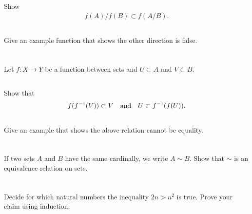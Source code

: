 \documentclass[11pt,letterpaper]{article}
\begin{document}
\subsection{}
Show
\begin{align}
    f(A)/f(B) \subset f(A/B).
\end{align}

\subsection{}
Give an example function that shows the other direction is false.

\section{}
Let $f: X\to Y$ be a function between sets and $U\subset A$ and $V\subset B$. 

\subsection{}
Show that
\begin{align}
    f(f^{-1}(V)) \subset V \quad \mbox{and} \quad U \subset f^{-1}(f(U)).
\end{align}

\subsection{}
Give an example that shows the above relation cannot be equality.

\section{}
If two sets $A$ and $B$ have the same cardinally, we write $A\sim B$. Show that $\sim$ is an equivalence relation on sets.

\section{}
Decide for which natural numbers the inequality $2n > n^2$ is true.
Prove your claim using induction.

    
    
% 
% 
\end{document}
